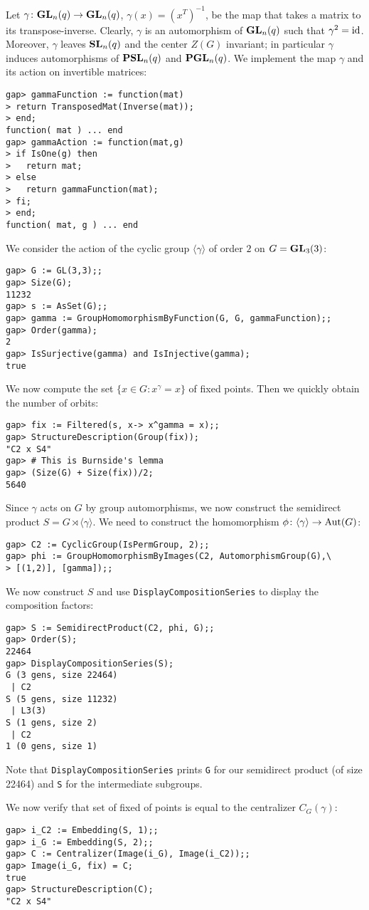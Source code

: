 \begin{example}
\label{exa:GL33}
Let $\gamma\colon \mathbf{GL}_n(q)\to \mathbf{GL}_n(q)$, $\gamma(x) = (x^T)^{-1}$, 
be the map that takes a matrix to its transpose-inverse.
Clearly, $\gamma$ is an automorphism of $\mathbf{GL}_n(q)$ such that $\gamma^2=\operatorname{id}$.
Moreover, $\gamma$ leaves $\mathbf{SL}_n(q)$ and the center $Z(G)$ invariant; in particular $\gamma$  induces automorphisms of $\mathbf{PSL}_n(q)$ and $\mathbf{PGL}_n(q)$. We implement
the map $\gamma$ and its action on invertible matrices:
\begin{lstlisting}
gap> gammaFunction := function(mat)
> return TransposedMat(Inverse(mat));
> end;
function( mat ) ... end
gap> gammaAction := function(mat,g)
> if IsOne(g) then
>   return mat;
> else
>   return gammaFunction(mat);
> fi;
> end;
function( mat, g ) ... end
\end{lstlisting}

We consider the action of the cyclic group $\langle\gamma\rangle$ of order $2$  
on $G = \mathbf{GL}_3(3)$:
\begin{lstlisting}
gap> G := GL(3,3);;
gap> Size(G);
11232
gap> s := AsSet(G);;
gap> gamma := GroupHomomorphismByFunction(G, G, gammaFunction);;
gap> Order(gamma);
2
gap> IsSurjective(gamma) and IsInjective(gamma);
true
\end{lstlisting}
We now compute the set 
$\{x\in G:x^\gamma=x\}$ 
of fixed points. Then 
we quickly obtain the number of orbits:  
\begin{lstlisting}
gap> fix := Filtered(s, x-> x^gamma = x);;
gap> StructureDescription(Group(fix));
"C2 x S4"
gap> # This is Burnside's lemma  
gap> (Size(G) + Size(fix))/2;
5640
\end{lstlisting}

Since $\gamma$ acts on $G$ by group automorphisms,
we now construct the semidirect product
$S=G\rtimes\langle\gamma\rangle$. We need
to construct the  
homomorphism $\phi\colon \langle\gamma\rangle\to\operatorname{Aut}(G)$: 
\begin{lstlisting}
gap> C2 := CyclicGroup(IsPermGroup, 2);;
gap> phi := GroupHomomorphismByImages(C2, AutomorphismGroup(G),\ 
> [(1,2)], [gamma]);;
\end{lstlisting}
We now construct $S$ and use \lstinline{DisplayCompositionSeries} 
to display the composition factors:
\begin{lstlisting}
gap> S := SemidirectProduct(C2, phi, G);;
gap> Order(S);
22464
gap> DisplayCompositionSeries(S);
G (3 gens, size 22464)
 | C2
S (5 gens, size 11232)
 | L3(3)
S (1 gens, size 2)
 | C2
1 (0 gens, size 1)
\end{lstlisting}
Note that \lstinline{DisplayCompositionSeries} prints \lstinline{G}
for our semidirect product (of size 22464) 
and \lstinline{S} for the intermediate subgroups. 

We now verify that set of fixed of points
is equal to the centralizer
$C_G(\gamma)$:  
\begin{lstlisting}
gap> i_C2 := Embedding(S, 1);;
gap> i_G := Embedding(S, 2);;
gap> C := Centralizer(Image(i_G), Image(i_C2));;
gap> Image(i_G, fix) = C;
true
gap> StructureDescription(C);
"C2 x S4"
\end{lstlisting}
\end{example}

